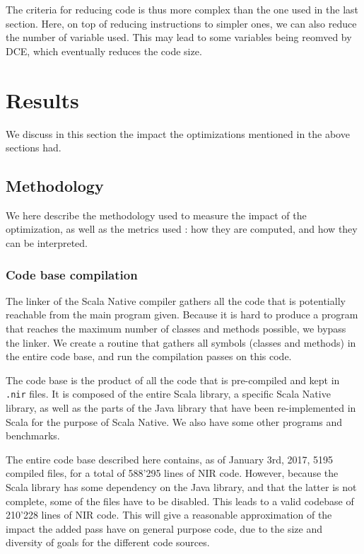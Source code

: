 \documentclass[11pt,a4paper]{article}
\begin{document}
The criteria for reducing code is thus more complex than the one used in the last section. Here, on top of reducing instructions to simpler ones, we can also reduce the number of variable used. This may lead to some variables being reomved by DCE, which eventually reduces the code size. 




\section{Results}

We discuss in this section the impact the optimizations mentioned in the above sections had.

\subsection{Methodology}

We here describe the methodology used to measure the impact of the optimization, as well as the metrics used : how they are computed, and how they can be interpreted.

\subsubsection{Code base compilation}

\label{codebase}

The linker of the Scala Native compiler gathers all the code that is potentially reachable from the main program given. Because it is hard to produce a program that reaches the maximum number of classes and methods possible, we bypass the linker. We create a routine that gathers all symbols (classes and methods) in the entire code base, and run the compilation passes on this code.

The code base is the product of all the code that is pre-compiled and kept in \texttt{.nir} files. It is composed of the entire Scala library, a specific Scala Native library, as well as the parts of the Java library that have been re-implemented in Scala for the purpose of Scala Native. We also have some other programs and benchmarks.

The entire code base described here contains, as of January 3rd, 2017, 5195 compiled files, for a total of 588'295 lines of NIR code. However, because the Scala library has some dependency on the Java library, and that the latter is not complete, some of the files have to be disabled. This leads to a valid codebase of 210'228 lines of NIR code. This will give a reasonable approximation of the impact the added pass have on general purpose code, due to the size and diversity of goals for the different code sources.
\end{document}
